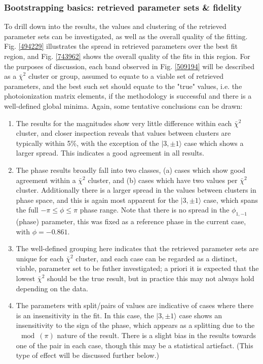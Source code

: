 \documentclass[10pt]{article}
\begin{document}
\subsubsection{Bootstrapping basics: retrieved parameter sets \& fidelity\label{sec:bootstrap-fidelity}}

To drill down into the results, the values and clustering of the retrieved parameter sets can be investigated, as well as the overall quality of the fitting. Fig. \ref{494229} illustrates the spread in retrieved parameters over the best fit region, and Fig. \ref{743962} shows the overall quality of the fits in this region. For the purposes of discussion, each band observed in Fig. \ref{509194} will be described as a $\bar{\chi}^2$ cluster or group, assumed to equate to a viable set of retrieved parameters, and the best such set should equate to the "true" values, i.e. the photoionization matrix elements, if the methodology is successful and there is a well-defined global minima. Again, some tentative conclusions can be drawn:

\begin{enumerate}
\item The results for the magnitudes show very little difference within each $\bar{\chi}^2$ cluster, and closer inspection reveals that values between clusters are typically within 5\%, with the exception of the $|3,\pm1\rangle$ case which shows a larger spread. This indicates a good agreement in all results.
\item The phase results broadly fall into two classes, (a) cases which show good agreement within a $\bar{\chi}^2$ cluster, and (b) cases which have two values per $\bar{\chi}^2$ cluster. Additionally there is a larger spread in the values between clusters in phase space, and this is again most apparent for the $|3,\pm1\rangle$ case, which spans the full $-\pi\leq\phi\leq\pi$ phase range. Note that there is no spread in the $\phi_{1,-1}$ (phase) parameter, this was fixed as a reference phase in the current case, with $\phi=-0.861$.
\item The well-defined grouping here indicates that the retrieved parameter sets are unique for each $\bar{\chi}^2$ cluster, and each case can be regarded as a distinct, viable, parameter set to be futher investigated; a priori it is expected that the lowest $\bar{\chi}^2$ should be the true result, but in practice this may not always hold depending on the data.
\item The parameters with split/pairs of values are indicative of cases where there is an insensitivity in the fit. In this case, the $|3,\pm1\rangle$ case shows an insensitivity to the sign of the phase, which appears as a splitting due to the $\mod(\pi)$ nature of the result. There is a slight bias in the results towards one of the pair in each case, though this may be a statistical artiefact. (This type of effect will be discussed further below.)
\end{enumerate}
\end{document}
